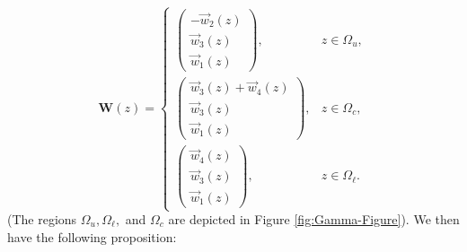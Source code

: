 \documentclass[usenames,dvipsnames]{article}
\theoremstyle{definition}
\numberwithin{equation}{section}
\numberwithin{figure}{section}
\begin{document}
    \begin{equation}
        \boldsymbol{W}(z) =
        \begin{cases}
            \begin{pmatrix}
            -\vec{w}_2(z) \\
            \vec{w}_3(z) \\
            \vec{w}_1(z)
            \end{pmatrix},& z \in\Omega_u, \\
            \begin{pmatrix}
                \vec{w}_3(z) + \vec{w}_4(z) \\
                \vec{w}_3(z) \\
                \vec{w}_1(z)
            \end{pmatrix}, & z \in \Omega_c,\\
            \begin{pmatrix}
            \vec{w}_4(z) \\
            \vec{w}_3(z) \\
            \vec{w}_1(z)
            \end{pmatrix}, & z \in \Omega_{\ell}.
        \end{cases}
    \end{equation}
(The regions $\Omega_{u},\Omega_{\ell},$ and $\Omega_c$ are depicted in Figure \ref{fig:Gamma-Figure}). We then have the following proposition:
\end{document}
